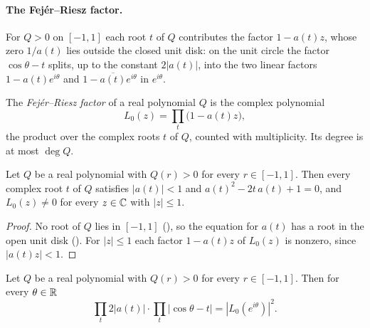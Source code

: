 \paragraph{The Fej\'er--Riesz factor.}
For $Q > 0$ on $[-1, 1]$ each root $t$ of $Q$ contributes the factor $1 - a(t) z$, whose zero
$1/a(t)$ lies outside the closed unit disk: on the unit circle the factor $\cos\theta - t$ splits,
up to the constant $2 |a(t)|$, into the two linear factors $1 - a(t) e^{i\theta}$ and
$1 - \overline{a(t)} e^{i\theta}$ in $e^{i\theta}$.

\begin{definition}
\label{def:daub-fejer-riesz-factor}
\leanok
{}
The \emph{Fej\'er--Riesz factor} of a real polynomial $Q$ is the complex polynomial
\[
  L_0(z) = \prod_t \bigl(1 - a(t) z\bigr) ,
\]
the product over the complex roots $t$ of $Q$, counted with multiplicity. Its degree is at most
$\deg Q$.
\end{definition}

\begin{lemma}
\label{lem:daub-fejer-riesz-factor-zeros}
\leanok
{}
Let $Q$ be a real polynomial with $Q(r) > 0$ for every $r \in [-1, 1]$. Then every complex root
$t$ of $Q$ satisfies $|a(t)| < 1$ and $a(t)^2 - 2t \, a(t) + 1 = 0$, and $L_0(z) \neq 0$ for
every $z \in \mathbb{C}$ with $|z| \leq 1$.
\end{lemma}

\begin{proof}
\leanok
{}
No root of $Q$ lies in $[-1, 1]$ (), so the equation for $a(t)$
has a root in the open unit disk (). For $|z| \leq 1$ each factor
$1 - a(t) z$ of $L_0(z)$ is nonzero, since $|a(t) z| < 1$.
\end{proof}

\begin{lemma}
\label{lem:daub-fejer-riesz-factor-modulus}
\leanok
{}
Let $Q$ be a real polynomial with $Q(r) > 0$ for every $r \in [-1, 1]$. Then for every
$\theta \in \mathbb{R}$
\[
  \prod_t 2 |a(t)| \cdot \prod_t |\cos\theta - t| = |L_0(e^{i\theta})|^2 .
\]
\end{lemma}

